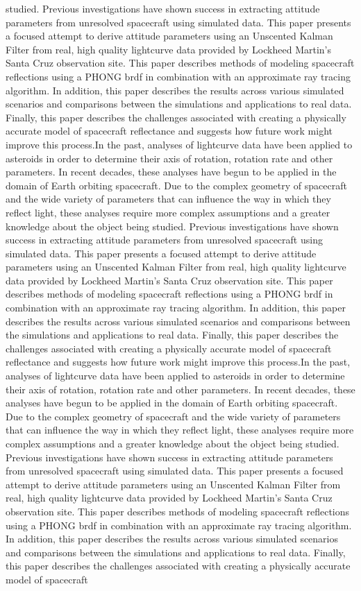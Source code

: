studied. Previous investigations have shown success in extracting attitude parameters from unresolved spacecraft using simulated data. This paper presents a focused attempt to derive attitude parameters using an Unscented Kalman Filter from real, high quality lightcurve data provided by Lockheed Martin's Santa Cruz observation site. This paper describes methods of modeling spacecraft reflections using a PHONG brdf in combination with an approximate ray tracing algorithm. In addition, this paper describes the results across various simulated scenarios and comparisons between the simulations and applications to real data. Finally, this paper describes the challenges associated with creating a physically accurate model of spacecraft reflectance and suggests how future work might improve this process.In the past, analyses of lightcurve data have been applied to asteroids in order to determine their axis of rotation, rotation rate and other parameters. In recent decades, these analyses have begun to be applied in the domain of Earth orbiting spacecraft. Due to the complex geometry of spacecraft and the wide variety of parameters that can influence the way in which they reflect light, these analyses require more complex assumptions and a greater knowledge about the object being studied. Previous investigations have shown success in extracting attitude parameters from unresolved spacecraft using simulated data. This paper presents a focused attempt to derive attitude parameters using an Unscented Kalman Filter from real, high quality lightcurve data provided by Lockheed Martin's Santa Cruz observation site. This paper describes methods of modeling spacecraft reflections using a PHONG brdf in combination with an approximate ray tracing algorithm. In addition, this paper describes the results across various simulated scenarios and comparisons between the simulations and applications to real data. Finally, this paper describes the challenges associated with creating a physically accurate model of spacecraft reflectance and suggests how future work might improve this process.In the past, analyses of lightcurve data have been applied to asteroids in order to determine their axis of rotation, rotation rate and other parameters. In recent decades, these analyses have begun to be applied in the domain of Earth orbiting spacecraft. Due to the complex geometry of spacecraft and the wide variety of parameters that can influence the way in which they reflect light, these analyses require more complex assumptions and a greater knowledge about the object being studied. Previous investigations have shown success in extracting attitude parameters from unresolved spacecraft using simulated data. This paper presents a focused attempt to derive attitude parameters using an Unscented Kalman Filter from real, high quality lightcurve data provided by Lockheed Martin's Santa Cruz observation site. This paper describes methods of modeling spacecraft reflections using a PHONG brdf in combination with an approximate ray tracing algorithm. In addition, this paper describes the results across various simulated scenarios and comparisons between the simulations and applications to real data. Finally, this paper describes the challenges associated with creating a physically accurate model of spacecraft 
